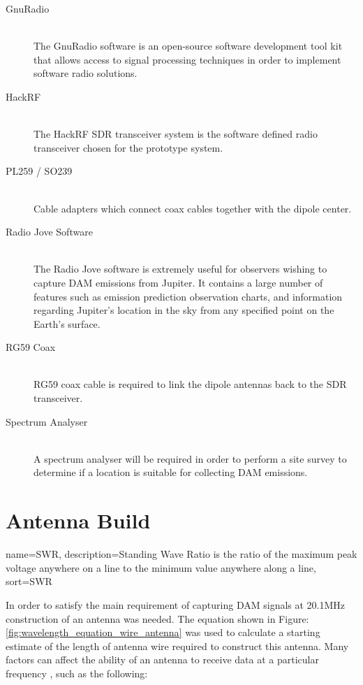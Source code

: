\documentclass[runningheads,a4paper]{llncs}
\begin{document}
\begin{description}
  \item[GnuRadio] \hfill \\
  The GnuRadio software is an open-source software development tool kit that allows access to signal processing techniques in order to implement software radio solutions.
  \item[HackRF] \hfill \\
  The HackRF \gls{SDR} transceiver system is the software defined radio transceiver chosen for the prototype system.
  \item[PL259 / SO239] \hfill \\
  Cable adapters which connect coax cables together with the dipole center.
  \item[Radio Jove Software] \hfill \\
  The Radio Jove software is extremely useful for observers wishing to capture \gls{DAM} emissions from Jupiter. It contains a large number of features such as emission prediction observation charts, and information regarding Jupiter's location in the sky from any specified point on the Earth's surface.
  \item[RG59 Coax] \hfill \\
  RG59 coax cable is required to link the dipole antennas back to the \gls{SDR} transceiver.
  \item[Spectrum Analyser] \hfill \\
  A spectrum analyser will be required in order to perform a site survey to determine if a location is suitable for collecting \gls{DAM} emissions.
\end{description}


\section*{Antenna Build}

{
  name={SWR},
  description={Standing Wave Ratio is the ratio of the maximum peak voltage
  	anywhere on a line to the minimum value anywhere along a line},
  sort=SWR
}

In order to satisfy the main requirement of capturing \gls{DAM} signals at 20.1MHz construction of an antenna was needed. The equation shown in Figure: \ref{fig:wavelength_equation_wire_antenna} was used to calculate a starting estimate of the length of antenna wire required to construct this antenna. Many factors can affect the ability of an antenna to receive data at a particular frequency \citep{arrl-00}, such as the following:
\end{document}
